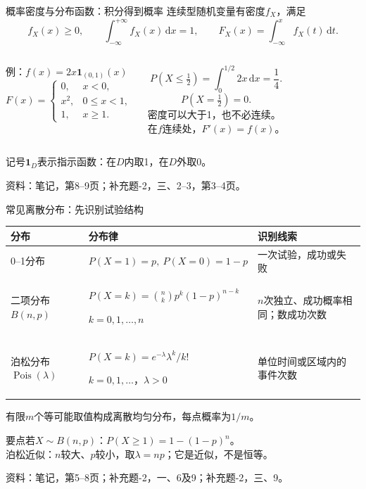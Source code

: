 \documentclass[aspectratio=169,10pt]{beamer}
\let\reviewnormalsize\normalsize
\renewcommand{\normalsize}{\reviewnormalsize
  \setlength{\abovedisplayskip}{5pt plus 1pt minus 1pt}
  \setlength{\belowdisplayskip}{5pt plus 1pt minus 1pt}
  \setlength{\abovedisplayshortskip}{3pt plus 1pt}
  \setlength{\belowdisplayshortskip}{3pt plus 1pt}}
\newcommand{\dd}{\,\mathrm{d}}
\newcommand{\ind}{\mathbf{1}}
\DeclareMathOperator{\Pois}{Pois}
\newcommand{\source}[1]{\vfill{\color{Muted}\fontsize{6.5}{8}\selectfont 资料：#1\par}}
\newcommand{\key}[1]{\begin{block}{要点}#1\end{block}}
\begin{document}
\begin{frame}[t]{概率密度与分布函数：积分得到概率}
连续型随机变量有密度$f_X$，满足
\[
f_X(x)\ge0,\qquad\int_{-\infty}^{+\infty}f_X(x)\dd x=1,
\qquad F_X(x)=\int_{-\infty}^{x}f_X(t)\dd t.
\]
\begin{columns}[T]
\begin{block}{例：$f(x)=2x\ind_{(0,1)}(x)$}
\[
F(x)=\begin{cases}0,&x<0,\\x^2,&0\le x<1,\\1,&x\ge1.\end{cases}
\]
\end{block}
\[
P(X\le\tfrac12)=\int_0^{1/2}2x\dd x=\frac14.
\]
\[
P(X=\tfrac12)=0.
\]
密度可以大于1，也不必连续。\\
在$f$连续处，$F'(x)=f(x)$。
\end{columns}
{\small 记号$\ind_D$表示指示函数：在$D$内取1，在$D$外取0。}
\source{笔记，第8--9页；补充题-2，三、2--3，第3--4页。}
\end{frame}

\begin{frame}[t]{常见离散分布：先识别试验结构}
\small
\renewcommand{\arraystretch}{1.65}
\begin{tabular}{p{2.5cm}p{6.2cm}p{4.2cm}}
\toprule
分布 & 分布律 & 识别线索\\\midrule
0--1分布 & $P(X=1)=p,\ P(X=0)=1-p$ & 一次试验，成功或失败\\
二项分布$B(n,p)$ & $P(X=k)=\binom nkp^k(1-p)^{n-k}$\par $k=0,1,\ldots,n$ & $n$次独立、成功概率相同；数成功次数\\
泊松分布$\Pois(\lambda)$ & $P(X=k)=e^{-\lambda}\lambda^k/k!$\par $k=0,1,\ldots$，$\lambda>0$ & 单位时间或区域内的事件次数\\\bottomrule
\end{tabular}
\normalsize
有限$m$个等可能取值构成离散均匀分布，每点概率为$1/m$。
\key{若$X\sim B(n,p)$：$P(X\ge1)=1-(1-p)^n$。\\
泊松近似：$n$较大、$p$较小，取$\lambda=np$；它是近似，不是恒等。}
\source{笔记，第5--8页；补充题-2，一、6及9；补充题-2，三、9。}
\end{frame}
\end{document}
